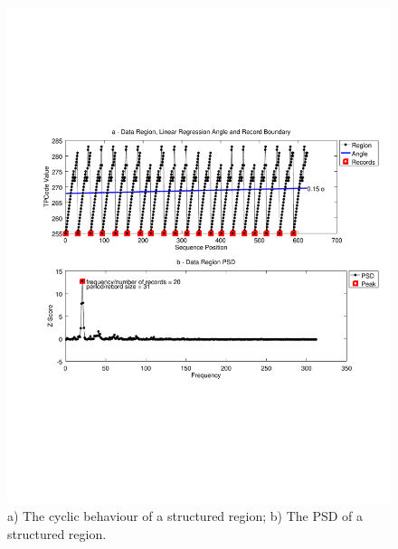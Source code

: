 \begin{figure}[h]
  \centering
     \includegraphics[trim={2.5cm 7.5cm 1cm 6.5cm}, width=\linewidth
     ]{img/fftreg.pdf}
  \caption{\small{a) The cyclic behaviour of a structured region; b) The PSD of a structured region.}}
  \label{fig:fftreg}
\end{figure}

\vspace{-0.3cm}

